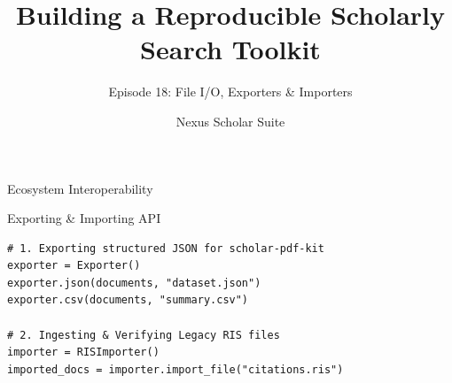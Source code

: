 \documentclass[aspectratio=169]{beamer}
\title{Building a Reproducible Scholarly Search Toolkit}
\subtitle{Episode 18: File I/O, Exporters \& Importers}
\author{Nexus Scholar Suite}
\date{}
\begin{document}
\begin{frame}[plain]
  \titlepage
\end{frame}

\begin{frame}{Ecosystem Interoperability}
  \begin{center}
  \end{center}
\end{frame}

\begin{frame}[fragile]{Exporting & Importing API}
\begin{lstlisting}[style=nexuspython]
# 1. Exporting structured JSON for scholar-pdf-kit
exporter = Exporter()
exporter.json(documents, "dataset.json")
exporter.csv(documents, "summary.csv")

# 2. Ingesting & Verifying Legacy RIS files
importer = RISImporter()
imported_docs = importer.import_file("citations.ris")
\end{lstlisting}
\end{frame}
\end{document}
